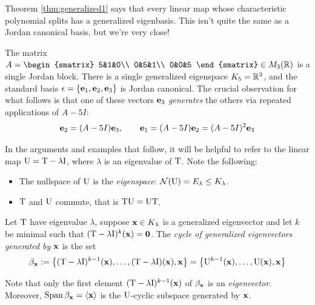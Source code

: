 

\pagebreak[3]



Theorem \ref{thm:generalized1} says that every linear map whose characteristic polynomial splits has a generalized eigenbasis. This isn't quite the same as a Jordan canonical basis, but we're very close!

\begin{example}{}{}
	The matrix $A=
	\begin{smatrix}
		5&1&0\\
		0&5&1\\
		0&0&5
	\end{smatrix}
	\in M_3(\R)$ is a single Jordan block. There is a single generalized eigenspace $K_5=\mathbb{R}^3$, and the standard basis $\epsilon=\{{\mathbf{e}}_1,{\mathbf{e}}_2,{\mathbf{e}}_3\}$ is Jordan canonical.\smallbreak
	The crucial observation for what follows is that one of these vectors ${\mathbf{e}}_3$ \emph{generates} the others via repeated applications of $A-5I$:
	\[
		{\mathbf{e}}_2=(A-5I){\mathbf{e}}_3,\qquad {\mathbf{e}}_1=(A-5I){\mathbf{e}}_2=(A-5I)^2{\mathbf{e}}_3
	\]
\end{example}

In the arguments and examples that follow, it will be helpful to refer to the linear map $\mathrm{U}=\mathrm{T}-\lambda\mathrm{I}$, where $\lambda$ is an eigenvalue of $\mathrm{T}$. Note the following:
\begin{itemize}
  \item The nullspace of $\mathrm{U}$ is the \emph{eigenspace}: $\mathcal{N}(\mathrm{U})=E_\lambda\le K_\lambda$.
  \item $\mathrm{T}$ and $\mathrm{U}$ commute, that is $\mathrm{T}\mathrm{U}=\mathrm{U}\mathrm{T}$.
\end{itemize}

\begin{defn}{}{}
	Let $\mathrm{T}$ have eigenvalue $\lambda$, suppose ${\mathbf{x}}\in K_\lambda$ is a generalized eigenvector and let $k$ be minimal such that $(\mathrm{T}-\lambda\mathrm{I})^k({\mathbf{x}})=\mathbf{0}$. The \emph{cycle of generalized eigenvectors generated by ${\mathbf{x}}$} is the set
	\[
		\beta_{\mathbf{x}}:=\left\{(\mathrm{T}-\lambda \mathrm{I})^{k-1}({\mathbf{x}}),\ldots,(\mathrm{T}-\lambda \mathrm{I})({\mathbf{x}}),{\mathbf{x}}\right\}
		=\left\{\mathrm{U}^{k-1}({\mathbf{x}}),\ldots,\mathrm{U}({\mathbf{x}}),{\mathbf{x}}\right\}
	\]
\end{defn}

Note that only the first element $(\mathrm{T}-\lambda\mathrm{I})^{k-1}({\mathbf{x}})$ of $\beta_{{\mathbf{x}}}$ is an \emph{eigenvector}. Moreover,  $\operatorname{Span}\beta_{\mathbf{x}}=\left\langle {\mathbf{x}}\right\rangle$ is the $\mathrm{U}$-cyclic subspace generated by ${\mathbf{x}}$.\smallbreak


